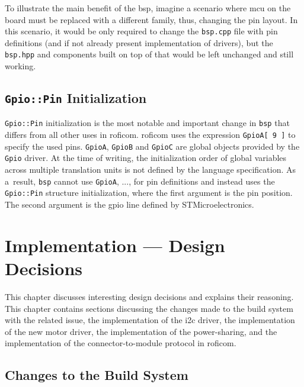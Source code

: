 \documentclass[
  digital,     %
  oneside,     %
  nosansbold,  %
  nocolorbold, %
  nolof,         %
  nolot,         %
]{fithesis4}
\newcommand{\TODO}[1]{#1} %
\newcommand{\TODOLIST}[1]{}
\begin{document}
To illustrate the main benefit of the \acrshort{bsp}, imagine a scenario where \acrshort{mcu} on the
board must be replaced with a different family, thus, changing the pin layout. In this scenario, it
would be only required to change the \verb|bsp.cpp| file with pin definitions (and if not already
present implementation of drivers), but the \verb|bsp.hpp| and components built on top of that would
be left unchanged and still working.

\section[ Gpio::Pin Initialization ]{ \lstinline|Gpio::Pin| Initialization }

\lstinline{Gpio::Pin} initialization is the most notable and important change in \lstinline{bsp}
that differs from all other uses in \acrshort{roficom}. \acrshort{roficom} uses the expression
\lstinline{GpioA[ 9 ]} to specify the used pins. \lstinline{GpioA}, \lstinline{GpioB} and
\lstinline{GpioC} are global objects provided by the \lstinline{Gpio} driver. At the time of
writing, the initialization order of global variables across multiple translation units is not
defined by the language specification. As a~result, \lstinline{bsp} cannot use \lstinline{GpioA},
..., for pin definitions and instead uses the \lstinline{Gpio::Pin} structure initialization, where
the first argument is the pin position. The second argument is the \acrshort{gpio} line defined by
STMicroelectronics.

\chapter{ Implementation --- Design Decisions } \label{ch:design}

This chapter discusses interesting design decisions and explains their reasoning. This chapter
contains sections discussing the changes made to the build system with the related issue, the
implementation of the \acrshort{i2c} driver, the implementation of the new motor driver, the
implementation of the power-sharing, and the implementation of the connector-to-module protocol in
\acrshort{roficom}.

\section{ Changes to the Build System }
\TODOLIST{
\begin{itemize}
    \item static buffer vs ram
    \item Hard fault = ram had too high static usage, minimizing the usage by lower the number of available buckets for packets solved this (memory::pool)
\end{itemize}
}
\end{document}
